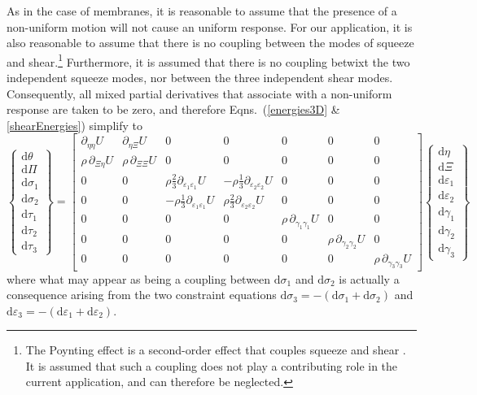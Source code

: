As in the case of membranes, it is reasonable to assume that the presence of a non-uniform motion will not cause an uniform response.  For our application, it is also reasonable to assume that there is no coupling between the modes of squeeze and shear.\footnote{
   The Poynting effect is a second-order effect that couples squeeze and shear \cite{FreedZamani19}.  It is assumed that such a coupling does not play a contributing role in the current application, and can therefore be neglected.
}
Furthermore, it is assumed that there is no coupling betwixt the two independent squeeze modes, nor between the three independent shear modes.  Consequently, all mixed partial derivatives that associate with a non-uniform response are taken to be zero, and therefore Eqns.~(\ref{energies3D} \& \ref{shearEnergies}) simplify to
\footnotesize
\begin{displaymath}
\left\{ \begin{matrix}
\mathrm{d} \theta \\ \mathrm{d} \Pi \\
\mathrm{d} \sigma_1 \\ \mathrm{d} \sigma_2 \\ 
\mathrm{d} \tau_1 \\ \mathrm{d} \tau_2 \\ \mathrm{d} \tau_3
\end{matrix} \right\} = \begin{bmatrix}
\partial_{\eta\eta} U & \partial_{\eta\Xi} U & 0 & 0 & 0 & 0 & 0 \\
\rho \, \partial_{\Xi\eta} U & \rho \, \partial_{\Xi\Xi} U & 0 & 0 & 0 & 0 & 0 \\
0 & 0 & \rho \tfrac{2}{3} \partial_{\varepsilon_1 \varepsilon_1} U & -\rho \tfrac{1}{3} \partial_{\varepsilon_2 \varepsilon_2} U & 0 & 0 & 0 \\
0 & 0 & -\rho \tfrac{1}{3} \partial_{\varepsilon_1 \varepsilon_1} U & \rho \tfrac{2}{3} \partial_{\varepsilon_2 \varepsilon_2} U & 0 & 0 & 0 \\
0 & 0 & 0 & 0 & \rho \, \partial_{\gamma_1\gamma_1} U & 0 & 0 \\
0 & 0 & 0 & 0 & 0 & \rho \, \partial_{\gamma_2\gamma_2} U & 0 \\
0 & 0 & 0 & 0 & 0 & 0 & \rho \, \partial_{\gamma_3\gamma_3} U
\end{bmatrix}
\left\{ \begin{matrix}
\mathrm{d}\eta \\ \mathrm{d} \Xi \\
\mathrm{d} \varepsilon_1 \\ \mathrm{d} \varepsilon_2 \\
\mathrm{d} \gamma_1 \\ \mathrm{d} \gamma_2 \\ \mathrm{d} \gamma_3
\end{matrix} \right\}
\end{displaymath}
\normalsize
where what may appear as being a coupling between $\mathrm{d} \sigma_1$ and $\mathrm{d} \sigma_2$ is actually a consequence arising from the two constraint equations $\mathrm{d} \sigma_3 = -( \mathrm{d} \sigma_1 + \mathrm{d} \sigma_2 )$ and $\mathrm{d} \varepsilon_3 = -( \mathrm{d} \varepsilon_1 + \mathrm{d} \varepsilon_2 )$.

